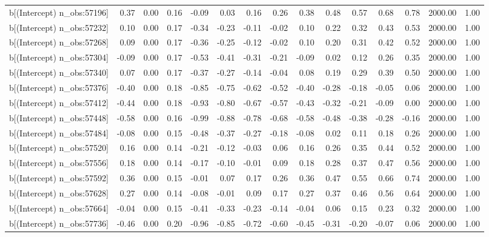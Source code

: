 \begin{table}[ht]
\begin{tabular}{rrrrrrrrrrrrrrr}
  b[(Intercept) n\_obs:57196] & 0.37 & 0.00 & 0.16 & -0.09 & 0.03 & 0.16 & 0.26 & 0.38 & 0.48 & 0.57 & 0.68 & 0.78 & 2000.00 & 1.00 \\ 
  b[(Intercept) n\_obs:57232] & 0.10 & 0.00 & 0.17 & -0.34 & -0.23 & -0.11 & -0.02 & 0.10 & 0.22 & 0.32 & 0.43 & 0.53 & 2000.00 & 1.00 \\ 
  b[(Intercept) n\_obs:57268] & 0.09 & 0.00 & 0.17 & -0.36 & -0.25 & -0.12 & -0.02 & 0.10 & 0.20 & 0.31 & 0.42 & 0.52 & 2000.00 & 1.00 \\ 
  b[(Intercept) n\_obs:57304] & -0.09 & 0.00 & 0.17 & -0.53 & -0.41 & -0.31 & -0.21 & -0.09 & 0.02 & 0.12 & 0.26 & 0.35 & 2000.00 & 1.00 \\ 
  b[(Intercept) n\_obs:57340] & 0.07 & 0.00 & 0.17 & -0.37 & -0.27 & -0.14 & -0.04 & 0.08 & 0.19 & 0.29 & 0.39 & 0.50 & 2000.00 & 1.00 \\ 
  b[(Intercept) n\_obs:57376] & -0.40 & 0.00 & 0.18 & -0.85 & -0.75 & -0.62 & -0.52 & -0.40 & -0.28 & -0.18 & -0.05 & 0.06 & 2000.00 & 1.00 \\ 
  b[(Intercept) n\_obs:57412] & -0.44 & 0.00 & 0.18 & -0.93 & -0.80 & -0.67 & -0.57 & -0.43 & -0.32 & -0.21 & -0.09 & 0.00 & 2000.00 & 1.00 \\ 
  b[(Intercept) n\_obs:57448] & -0.58 & 0.00 & 0.16 & -0.99 & -0.88 & -0.78 & -0.68 & -0.58 & -0.48 & -0.38 & -0.28 & -0.16 & 2000.00 & 1.00 \\ 
  b[(Intercept) n\_obs:57484] & -0.08 & 0.00 & 0.15 & -0.48 & -0.37 & -0.27 & -0.18 & -0.08 & 0.02 & 0.11 & 0.18 & 0.26 & 2000.00 & 1.00 \\ 
  b[(Intercept) n\_obs:57520] & 0.16 & 0.00 & 0.14 & -0.21 & -0.12 & -0.03 & 0.06 & 0.16 & 0.26 & 0.35 & 0.44 & 0.52 & 2000.00 & 1.00 \\ 
  b[(Intercept) n\_obs:57556] & 0.18 & 0.00 & 0.14 & -0.17 & -0.10 & -0.01 & 0.09 & 0.18 & 0.28 & 0.37 & 0.47 & 0.56 & 2000.00 & 1.00 \\ 
  b[(Intercept) n\_obs:57592] & 0.36 & 0.00 & 0.15 & -0.01 & 0.07 & 0.17 & 0.26 & 0.36 & 0.47 & 0.55 & 0.66 & 0.74 & 2000.00 & 1.00 \\ 
  b[(Intercept) n\_obs:57628] & 0.27 & 0.00 & 0.14 & -0.08 & -0.01 & 0.09 & 0.17 & 0.27 & 0.37 & 0.46 & 0.56 & 0.64 & 2000.00 & 1.00 \\ 
  b[(Intercept) n\_obs:57664] & -0.04 & 0.00 & 0.15 & -0.41 & -0.33 & -0.23 & -0.14 & -0.04 & 0.06 & 0.15 & 0.23 & 0.32 & 2000.00 & 1.00 \\ 
  b[(Intercept) n\_obs:57736] & -0.46 & 0.00 & 0.20 & -0.96 & -0.85 & -0.72 & -0.60 & -0.45 & -0.31 & -0.20 & -0.07 & 0.06 & 2000.00 & 1.00 \\ 

\end{tabular}
\end{table}
